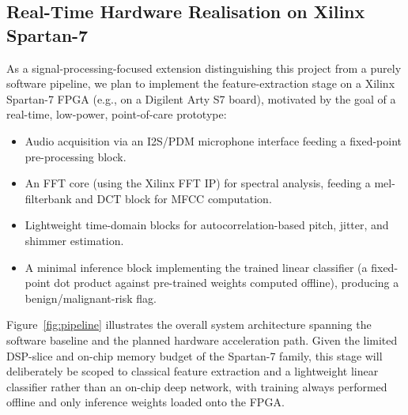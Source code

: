 \documentclass[conference]{IEEEtran}
\begin{document}
\subsection{Real-Time Hardware Realisation on Xilinx Spartan-7}
\label{sec:fpga}
As a signal-processing-focused extension distinguishing this project from a purely software pipeline, we plan to implement the feature-extraction stage on a Xilinx Spartan-7 FPGA (e.g., on a Digilent Arty S7 board), motivated by the goal of a real-time, low-power, point-of-care prototype:
\begin{itemize}
    \item Audio acquisition via an I2S/PDM microphone interface feeding a fixed-point pre-processing block.
    \item An FFT core (using the Xilinx FFT IP) for spectral analysis, feeding a mel-filterbank and DCT block for MFCC computation.
    \item Lightweight time-domain blocks for autocorrelation-based pitch, jitter, and shimmer estimation.
    \item A minimal inference block implementing the trained linear classifier (a fixed-point dot product against pre-trained weights computed offline), producing a benign/malignant-risk flag.
\end{itemize}
Figure~\ref{fig:pipeline} illustrates the overall system architecture spanning the software baseline and the planned hardware acceleration path. Given the limited DSP-slice and on-chip memory budget of the Spartan-7 family, this stage will deliberately be scoped to classical feature extraction and a lightweight linear classifier rather than an on-chip deep network, with training always performed offline and only inference weights loaded onto the FPGA.
\end{document}
